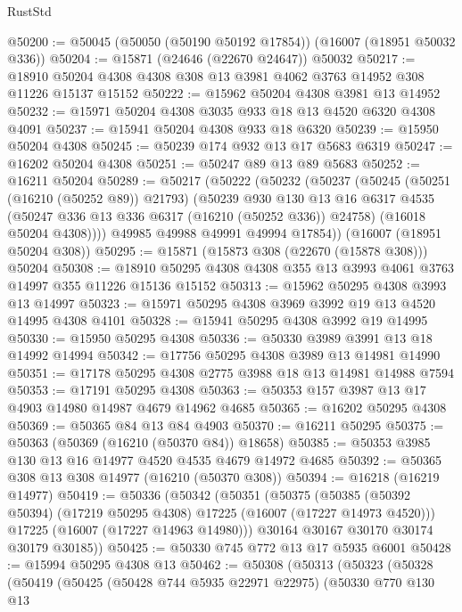 \begin{lexlean}{RustStd}
\begin{coremodule}
@50200 := @50045 (@50050 (@50190 @50192 @17854)) (@16007 (@18951 @50032 @336))
@50204 := @15871 (@24646 (@22670 @24647)) @50032
@50217 := @18910 @50204 @4308 @4308 @308 @13 @3981 @4062 @3763 @14952 @308 @11226 @15137 @15152
@50222 := @15962 @50204 @4308 @3981 @13 @14952
@50232 := @15971 @50204 @4308 @3035 @933 @18 @13 @4520 @6320 @4308 @4091
@50237 := @15941 @50204 @4308 @933 @18 @6320
@50239 := @15950 @50204 @4308
@50245 := @50239 @174 @932 @13 @17 @5683 @6319
@50247 := @16202 @50204 @4308
@50251 := @50247 @89 @13 @89 @5683
@50252 := @16211 @50204
@50289 := @50217
    (@50222
      (@50232
        (@50237
          (@50245
            (@50251 (@16210 (@50252 @89)) @21793)
            (@50239
              @930
              @130
              @13
              @16
              @6317
              @4535
              (@50247 @336 @13 @336 @6317 (@16210 (@50252 @336)) @24758)
              (@16018 @50204 @4308))))
        @49985
        @49988
        @49991
        @49994
        @17854))
    (@16007 (@18951 @50204 @308))
@50295 := @15871 (@15873 @308 (@22670 (@15878 @308))) @50204
@50308 := @18910 @50295 @4308 @4308 @355 @13 @3993 @4061 @3763 @14997 @355 @11226 @15136 @15152
@50313 := @15962 @50295 @4308 @3993 @13 @14997
@50323 := @15971 @50295 @4308 @3969 @3992 @19 @13 @4520 @14995 @4308 @4101
@50328 := @15941 @50295 @4308 @3992 @19 @14995
@50330 := @15950 @50295 @4308
@50336 := @50330 @3989 @3991 @13 @18 @14992 @14994
@50342 := @17756 @50295 @4308 @3989 @13 @14981 @14990
@50351 := @17178 @50295 @4308 @2775 @3988 @18 @13 @14981 @14988 @7594
@50353 := @17191 @50295 @4308
@50363 := @50353 @157 @3987 @13 @17 @4903 @14980 @14987 @4679 @14962 @4685
@50365 := @16202 @50295 @4308
@50369 := @50365 @84 @13 @84 @4903
@50370 := @16211 @50295
@50375 := @50363 (@50369 (@16210 (@50370 @84)) @18658)
@50385 := @50353 @3985 @130 @13 @16 @14977 @4520 @4535 @4679 @14972 @4685
@50392 := @50365 @308 @13 @308 @14977 (@16210 (@50370 @308))
@50394 := @16218 (@16219 @14977)
@50419 := @50336
    (@50342
      (@50351
        (@50375
          (@50385 (@50392 @50394) (@17219 @50295 @4308) @17225 (@16007 (@17227 @14973 @4520)))
          @17225
          (@16007 (@17227 @14963 @14980)))
        @30164
        @30167
        @30170
        @30174
        @30179
        @30185))
@50425 := @50330 @745 @772 @13 @17 @5935 @6001
@50428 := @15994 @50295 @4308 @13
@50462 := @50308
    (@50313
      (@50323
        (@50328
          (@50419
            (@50425
              (@50428 @744 @5935 @22971 @22975)
              (@50330
                @770
                @130
                @13

\end{coremodule}
\end{lexlean}
